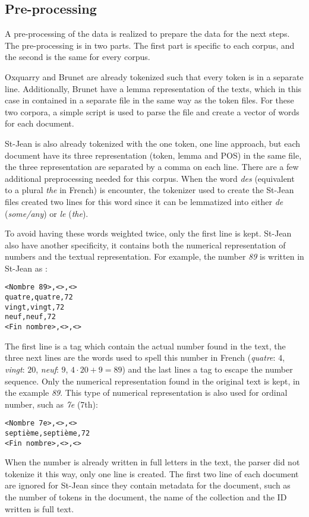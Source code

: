 \subsection{Pre-processing}

A pre-processing of the data is realized to prepare the data for the next steps.
The pre-processing is in two parts.
The first part is specific to each corpus, and the second is the same for every corpus.

Oxquarry and Brunet are already tokenized such that every token is in a separate line.
Additionally, Brunet have a lemma representation of the texts, which in this case in contained in a separate file in the same way as the token files.
For these two corpora, a simple script is used to parse the file and create a vector of words for each document.

St-Jean is also already tokenized with the one token, one line approach, but each document have its three representation (token, lemma and POS) in the same file, the three representation are separated by a comma on each line.
There are a few additional preprocessing needed for this corpus.
When the word \textit{des} (equivalent to a plural \textit{the} in French) is encounter, the tokenizer used to create the St-Jean files created two lines for this word since it can be lemmatized into either \textit{de} (\textit{some/any}) or \textit{le} (\textit{the}).

To avoid having these words weighted twice, only the first line is kept.
St-Jean also have another specificity, it contains both the numerical representation of numbers and the textual representation.
For example, the number \textit{89} is written in St-Jean as :
\begin{verbatim}
<Nombre 89>,<>,<>
quatre,quatre,72
vingt,vingt,72
neuf,neuf,72
<Fin nombre>,<>,<>
\end{verbatim}
The first line is a tag which contain the actual number found in the text, the three next lines are the words used to spell this number in French (\textit{quatre}: $4$, \textit{vingt}: $20$, \textit{neuf}: $9$, $4 \cdot 20 + 9 = 89$) and the last lines a tag to escape the number sequence.
Only the numerical representation found in the original text is kept, in the example \textit{89}.
This type of numerical representation is also used for ordinal number, such as \textit{7e} (7th):
\begin{verbatim}
<Nombre 7e>,<>,<>
septième,septième,72
<Fin nombre>,<>,<>
\end{verbatim}
When the number is already written in full letters in the text, the parser did not tokenize it this way, only one line is created.
The first two line of each document are ignored for St-Jean since they contain metadata for the document, such as the number of tokens in the document, the name of the collection and the ID written is full text.

